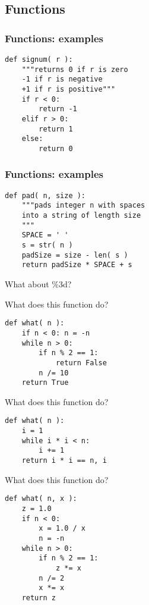 \documentclass[14pt,compress]{beamer}
\begin{document}

\subsection{Functions}
\begin{frame}[fragile]
\frametitle{Functions: examples}
  \begin{lstlisting}
def signum( r ):
    """returns 0 if r is zero
    -1 if r is negative
    +1 if r is positive"""
    if r < 0:
        return -1
    elif r > 0:
        return 1
    else:
        return 0
  \end{lstlisting}
\end{frame}

\begin{frame}[fragile]
  \frametitle{Functions: examples}
  \begin{lstlisting}
def pad( n, size ): 
    """pads integer n with spaces
    into a string of length size
    """
    SPACE = ' '
    s = str( n )
    padSize = size - len( s )
    return padSize * SPACE + s
  \end{lstlisting}
\pause
What about \%3d?
\end{frame}

\begin{frame}[fragile]
  {What does this function do?}
  \begin{lstlisting}
def what( n ):
    if n < 0: n = -n
    while n > 0:
        if n % 2 == 1:
            return False
        n /= 10
    return True
  \end{lstlisting}
\end{frame}

\begin{frame}[fragile]
  {What does this function do?}
\begin{lstlisting}
def what( n ):
    i = 1    
    while i * i < n:
        i += 1
    return i * i == n, i
  \end{lstlisting}
\end{frame}

\begin{frame}[fragile]
  {What does this function do?}
  \begin{lstlisting}
def what( n, x ):
    z = 1.0
    if n < 0:
        x = 1.0 / x
        n = -n
    while n > 0:
        if n % 2 == 1:
            z *= x
        n /= 2
        x *= x
    return z
  \end{lstlisting}
\end{frame}
\end{document}
